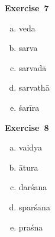 \begin{multicols}{2}
\noindent\textbf{Exercise~7}
\begin{enumerate}[a.]
\itemsep=0pt
\item veda 
\item sarva  
\item sarvadā 
\item sarvathā 
\item śarīra
\end{enumerate}

\noindent\textbf{Exercise~8}
\begin{enumerate}[a.]
\itemsep=0pt
\item vaidya 
\item ātura 
\item darśana 
\item sparśana 
\item praśna
\end{enumerate}
\end{multicols}
